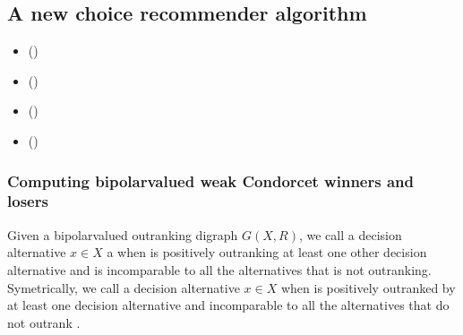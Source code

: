 \documentclass[a4paper,12pt,english]{sphinxhowto}
\begin{document}
\subsection{A new choice recommender algorithm}
\label{\detokenize{pearls:a-new-choice-recommender-algorithm}}\label{\detokenize{pearls:bipolar-valued-condorcet-winners}}
\begin{sphinxcontents}
\begin{itemize}
\item {} 
\sphinxAtStartPar
{}\label{\detokenize{pearls:id199}}{\hyperref[\detokenize{pearls:computing-bipolar-valued-weak-condorcet-winners-and-losers}]{}} ()

\item {} 
\sphinxAtStartPar
{}\label{\detokenize{pearls:id200}}{\hyperref[\detokenize{pearls:suitable-first-and-last-choice-recommendations}]{}} ()

\item {} 
\sphinxAtStartPar
{}\label{\detokenize{pearls:id201}}{\hyperref[\detokenize{pearls:ranking-by-choosing-with-bpv-sets-of-weak-condorcet-winners-and-losers}]{}} ()

\item {} 
\sphinxAtStartPar
{}\label{\detokenize{pearls:id202}}{\hyperref[\detokenize{pearls:efficiency-of-computing-weak-condorcet-winners-and-losers}]{}} ()

\end{itemize}
\end{sphinxcontents}


\subsubsection{Computing bipolar\sphinxhyphen{}valued weak Condorcet winners and losers}
\label{\detokenize{pearls:computing-bipolar-valued-weak-condorcet-winners-and-losers}}
\sphinxAtStartPar
Given a bipolar\sphinxhyphen{}valued outranking digraph \(G(X,R)\), we call a decision alternative \(x \in X\) a   when  is positively outranking at least one other decision alternative and is incomparable to all the alternatives that  is not outranking. Symetrically, we call a decision alternative \(x \in X\)   when  is positively outranked by at least one decision alternative and incomparable to all the alternatives that do not outrank .
\end{document}
